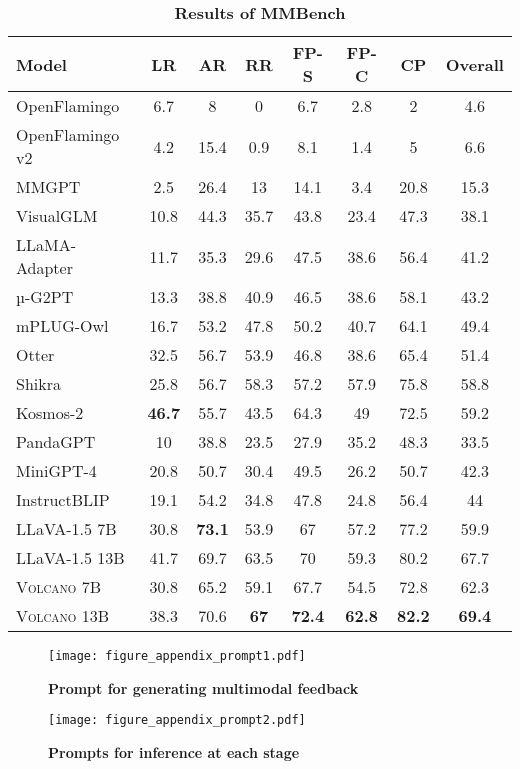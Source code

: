 \documentclass[11pt]{article}
\newcommand{\Ours}{\textsc{Volcano}}
\begin{document}
\begin{table*}[t]
\centering
\begin{tabular}{lcccccc|c}
\toprule
Model & LR  &	AR 	& RR 	& FP-S & 	FP-C &	CP & 	Overall \\
\midrule
OpenFlamingo & 6.7 & 8 & 0 & 6.7 & 2.8	& 2	& 4.6 \\
OpenFlamingo v2	& 4.2	& 15.4	& 0.9	& 8.1	& 1.4	& 5	& 6.6 \\
MMGPT	& 2.5	& 26.4	& 13	& 14.1	& 3.4	& 20.8	& 15.3 \\
VisualGLM	& 10.8	& 44.3	& 35.7	& 43.8	& 23.4	& 47.3	& 38.1 \\
LLaMA-Adapter	& 11.7	& 35.3	& 29.6	& 47.5	& 38.6	& 56.4	& 41.2 \\
µ-G2PT	& 13.3	& 38.8	& 40.9	& 46.5	& 38.6	& 58.1	& 43.2 \\
mPLUG-Owl	& 16.7	& 53.2	& 47.8	& 50.2	& 40.7	& 64.1	& 49.4 \\
Otter	& 32.5	& 56.7	& 53.9	& 46.8	& 38.6	& 65.4	& 51.4 \\
Shikra	& 25.8	& 56.7	& 58.3	& 57.2	& 57.9	& 75.8	& 58.8 \\
Kosmos-2	& \textbf{46.7}	& 55.7	& 43.5	& 64.3	& 49	& 72.5	& 59.2 \\
PandaGPT	& 10	& 38.8	& 23.5	& 27.9	& 35.2	& 48.3	& 33.5 \\
MiniGPT-4	& 20.8	& 50.7	& 30.4	& 49.5	& 26.2	& 50.7	& 42.3 \\
InstructBLIP	& 19.1	& 54.2	& 34.8	& 47.8	& 24.8	& 56.4	& 44 \\
\midrule
LLaVA-1.5 7B	& 30.8	& \textbf{73.1}	& 53.9	& 67	& 57.2	& 77.2	& 59.9 \\
LLaVA-1.5 13B	& 41.7	& 69.7	& 63.5	& 70	& 59.3	& 80.2	& 67.7 \\
{\Ours} 7B	& 30.8	& 65.2	& 59.1	& 67.7	& 54.5	& 72.8	& 62.3 \\
{\Ours} 13B	& 38.3	& 70.6	&\textbf{67}	& \textbf{72.4}	& \textbf{62.8}	& \textbf{82.2}	& \textbf{69.4} \\
\bottomrule
\end{tabular}
\caption{\textbf{Results of MMBench}}
\label{tab:Table9}
\end{table*}
\begin{figure*}[h]
\texttt{[image: figure\_appendix\_prompt1.pdf]}
\caption{\textbf{Prompt for generating multimodal feedback}}
\end{figure*}
\begin{figure*}[h]
\texttt{[image: figure\_appendix\_prompt2.pdf]}
\caption{\textbf{Prompts for inference at each stage}}
\end{figure*}
\end{document}
